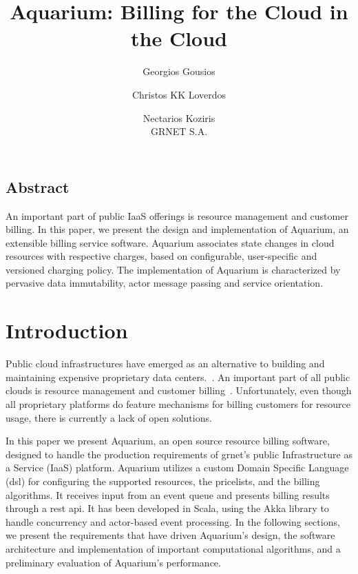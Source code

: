 \documentclass[letterpaper,twocolumn,10pt]{article}
\newcommand{\grnet}{{\sc grnet}\xspace}
\begin{document}
\date{}

\title{Aquarium: Billing for the Cloud in the Cloud}

\author{
{\rm Georgios Gousios}\\
\and
{\rm Christos KK Loverdos }\\
\and
{\rm Nectarios Koziris}\\
GRNET S.A.
} %

\maketitle


\thispagestyle{empty}

\subsection*{Abstract}

An important part of public IaaS offerings is resource management and
customer billing. In this paper, we present the design and
implementation of Aquarium, an extensible billing service software.
Aquarium associates state changes in cloud resources with respective
charges, based on configurable, user-specific and versioned charging
policy. The implementation of Aquarium is characterized by pervasive
data immutability, actor message passing and service orientation.

\section{Introduction}

Public cloud infrastructures have emerged as an alternative to
building and maintaining expensive proprietary data
centers.~\cite{Lourid10}. An important part of all public clouds is
resource management and customer billing~\cite{Armbr10}.
Unfortunately, even though all proprietary platforms do feature
mechanisms for billing customers for resource usage, there is
currently a lack of open solutions.

In this paper we present Aquarium, an open source resource billing software,
designed to handle the production  requirements of \grnet's public
Infrastructure as a Service (IaaS) platform. Aquarium utilizes a custom Domain
Specific Language ({\sc dsl}) for configuring the supported resources, the
pricelists, and the billing algorithms. It receives input from an event queue
and presents billing results through a {\sc rest api}. It has been developed
in Scala, using the Akka library to handle concurrency and actor-based
event processing. In the following sections, we present the requirements
that have driven Aquarium's design, the software architecture and
implementation of important computational algorithms, and a preliminary
evaluation of Aquarium's performance. 
\end{document}
